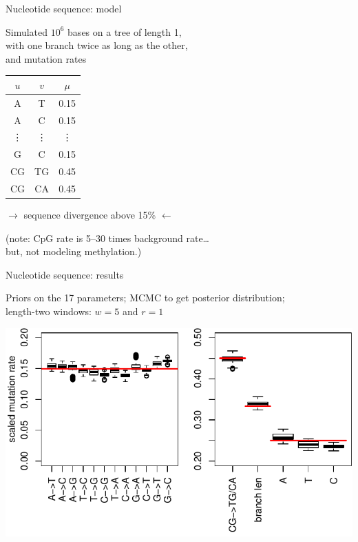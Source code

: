 \documentclass[smaller]{beamer}
\begin{document}
\begin{frame}{Nucleotide sequence: model}

  Simulated $10^6$ bases on a tree of length 1, \\
  with one branch twice as long as the other,\\
  and mutation rates
  {\small
  \begin{center}
    \begin{tabular}{c@{\quad$\to$\quad}c@{\quad at rate\quad }c}
      $u$  &  $v$  &  $\mu$  \\
      \hline
       A & T   &  0.15  \\
       A & C   &  0.15  \\
       \vdots & \vdots & \vdots \\
       G & C &  0.15  \\
      CG   &  TG   &  0.45 \\
      CG   &  CA   &  0.45 
    \end{tabular}
  \end{center}
  }

  \vspace{2em}

  $\longrightarrow$ sequence divergence above 15\% $\longleftarrow$
  
  \vspace{2em}

  ({\struct note:} CpG rate is 5--30 times background rate\ldots\\
  \hspace{3em} but, not modeling methylation.)

\end{frame}

\begin{frame}{Nucleotide sequence: results}

  Priors on the 17 parameters; MCMC to get posterior distribution;\\
  \hspace{2em} length-two windows: $w=5$ and $r=1$

  \begin{center}
\includegraphics[width=\textwidth]{../../writeup-plots/selsims-2013-06-03-13-17-0187525-estimate-boxplots}
\end{center}

\end{frame}
\end{document}
